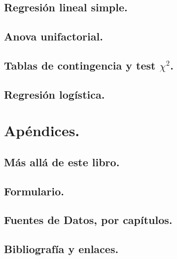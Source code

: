 \documentclass[10pt,a4paper]{book}
\begin{document}
\chapter{Regresión lineal simple.}
\label{cap:RegresionLinealSimple}


\chapter{Anova unifactorial.}
\label{cap:IntroduccionAnova}


\chapter{Tablas de contingencia y test $\chi^2$.}
\label{cap:TablasContingenciaTestChi2}


\chapter{Regresión logística.}
\label{cap:RegresionLogistica}



\newpage
\part*{Apéndices.}
\appendix

\chapter{Más allá de este libro.}
\label{apendice:MasAlla}



\chapter{Formulario.}
\label{apendice:Tablas}
\newpage


\newpage
\chapter{Fuentes de Datos, por capítulos.}
\label{apendice:FuentesDatos}


\chapter{Bibliografía y enlaces.}\label{apendice:comentarioBibliografia}

\end{document}

